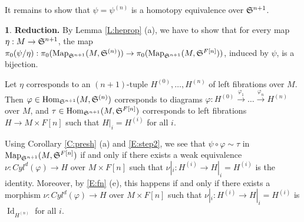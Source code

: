 \documentclass[12pt]{amsart}
\theoremstyle{plain}
\theoremstyle{definition}
\newtheorem{Emp}[Thm]{}
\numberwithin{equation}{section}
\newcommand{\lra}{\longrightarrow}
\newcommand{\rl}[1]{Lemma \ref{L:#1}}
\newcommand{\re}[1]{\ref{E:#1}}
\newcommand{\rco}[1]{Corollary \ref{C:#1}}
\newcommand{\Map}{\operatorname{Map}}
\newcommand{\Id}{\operatorname{Id}}
\newcommand{\Hom}{\operatorname{Hom}}
\renewcommand{\S}{\frak{S}}
\begin{document}
It remains to show that $\psi=\psi^{(n)}$ is a homotopy equivalence over $\S^{n+1}$. 

\begin{Emp} \label{E:step4}
{\bf  Reduction.} By \rl{heprop} (a), we have to show that  
for every map $\eta:M\to \S^{n+1}$, the  map
$\pi_0(\psi/\eta):\pi_0(\Map_{\S^{n+1}}(M,\S^{(n)}))\to
\pi_0(\Map_{\S^{n+1}}(M,\S^{F[n]}))$, induced by $\psi$, 
is a bijection.

Let $\eta$ corresponds to an $(n+1)$-tuple $H^{(0)},\ldots,
H^{(n)}$ of left fibrations over $M$. Then $\varphi\in
\Hom_{\S^{n+1}}(M,\S^{(n)})$ corresponds to  diagrams
$\varphi:H^{(0)}\overset{\varphi_1}{\lra}\ldots\overset{\varphi_n}{\lra}
H^{(n)}$ over $M$, and $\tau\in \Hom_{\S^{n+1}}(M,\S^{F[n]})$
corresponds to left fibrations $H\to M\times F[n]$ such that
$H|_i=H^{(i)}$ for all $i$.

Using \rco{presh} (a) and \re{step2}, we see that
$\psi\circ\varphi\sim \tau$ in $\Map_{\S^{n+1}}(M,\S^{F[n]})$  if
and only if there exists a weak equivalence $\nu:Cyl^d(\varphi)\to
H$ over $M\times F[n]$ such that  $\nu|_i:H^{(i)}\to H|_i=H^{(i)}$
is the identity. Moreover, by \re{fn} (e), this happens if and only if 
there exists a morphism $\nu:Cyl^d(\varphi)\to H$ over $M\times F[n]$ such that
$\nu|_i:H^{(i)}\to H|_i=H^{(i)}$ is $\Id_{H^{(n)}}$ for all $i$.
\end{Emp}
\end{document}
